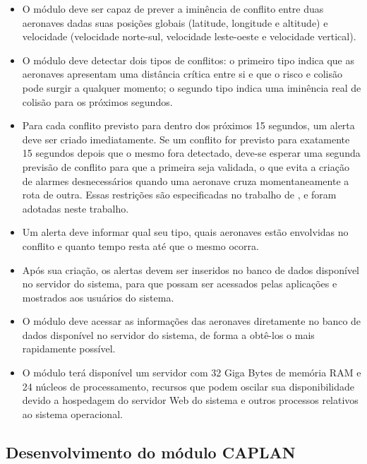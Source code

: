 \begin{itemize}

\item O módulo deve ser capaz de prever a iminência de conflito entre duas aeronaves dadas suas posições globais (latitude, longitude e altitude) e velocidade (velocidade norte-sul, velocidade leste-oeste e velocidade vertical).

\item O módulo deve detectar dois tipos de conflitos: o primeiro tipo indica que as aeronaves apresentam uma distância crítica entre si e que o risco e colisão pode surgir a qualquer momento; o segundo tipo indica uma iminência real de colisão para os próximos segundos.

\item Para cada conflito previsto para dentro dos próximos 15 segundos, um alerta deve ser criado imediatamente. Se um conflito for previsto para exatamente 15 segundos depois que o mesmo fora detectado, deve-se esperar uma segunda previsão de conflito para que a primeira seja validada, o que evita a criação de alarmes desnecessários quando uma aeronave cruza momentaneamente a rota de outra. Essas restrições são especificadas no trabalho de , e foram adotadas neste trabalho. 

\item Um alerta deve informar qual seu tipo, quais aeronaves estão envolvidas no conflito e quanto tempo resta até que o mesmo ocorra.

\item Após sua criação, os alertas devem ser inseridos no banco de dados disponível no servidor do sistema, para que possam ser acessados pelas aplicações e mostrados aos usuários do sistema. 

\item O módulo deve acessar as informações das aeronaves diretamente no banco de dados disponível no servidor do sistema, de forma a obtê-los o mais rapidamente possível.

\item O módulo terá disponível um servidor com 32 Giga Bytes de memória RAM e 24 núcleos de processamento, recursos que podem oscilar sua disponibilidade devido a hospedagem do servidor Web do sistema e outros processos relativos ao sistema operacional.

\end{itemize}


\subsection{Desenvolvimento do módulo CAPLAN}

